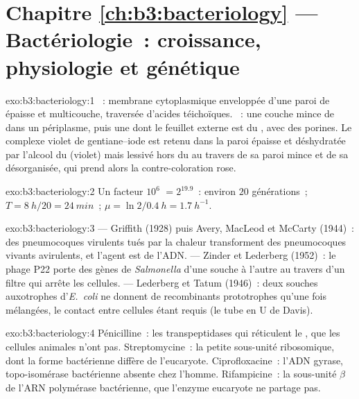 \section*{Chapitre \ref{ch:b3:bacteriology} --- Bactériologie~: croissance, physiologie et génétique}

\begin{solution}{exo:b3:bacteriology:1}
~: membrane cytoplasmique enveloppée d'une paroi de
 épaisse et multicouche, traversée d'acides téichoïques.
~: une couche mince de  dans un périplasme,
puis une  dont le feuillet externe est du
, avec des porines. Le complexe violet de
gentiane--iode est retenu dans la paroi épaisse et déshydratée par
l'alcool du  (violet) mais lessivé hors du  au
travers de sa paroi mince et de sa  désorganisée, qui
prend alors la contre-coloration rose.
\end{solution}

\begin{solution}{exo:b3:bacteriology:2}
Un facteur $10^{6}$ $= 2^{19.9}$~: environ $20$ générations~; $T = \qty{8}{h}/20
= \qty{24}{min}$~; $\mu = \ln 2/\qty{0.4}{h} = \qty{1.7}{h^{-1}}$.
\end{solution}

\begin{solution}{exo:b3:bacteriology:3}
 --- Griffith (1928) puis Avery, MacLeod et McCarty
(1944)~: des pneumocoques virulents tués par la chaleur transforment des
pneumocoques vivants avirulents, et l'agent est de l'ADN. 
--- Zinder et Lederberg (1952)~: le phage P22 porte des gènes de
\emph{Salmonella} d'une souche à l'autre au travers d'un filtre qui
arrête les cellules.  --- Lederberg et Tatum (1946)~: deux
souches auxotrophes d'\emph{E.~coli} ne donnent de recombinants
prototrophes qu'une fois mélangées, le contact entre cellules étant
requis (le tube en U de Davis).
\end{solution}

\begin{solution}{exo:b3:bacteriology:4}
Pénicilline~: les transpeptidases qui réticulent le , que
les cellules animales n'ont pas. Streptomycine~: la petite sous-unité
ribosomique, dont la forme bactérienne diffère de l'eucaryote.
Ciprofloxacine~: l'ADN gyrase, topo-isomérase bactérienne absente chez
l'homme. Rifampicine~: la sous-unité $\beta$ de l'ARN polymérase
bactérienne, que l'enzyme eucaryote ne partage pas.
\end{solution}

